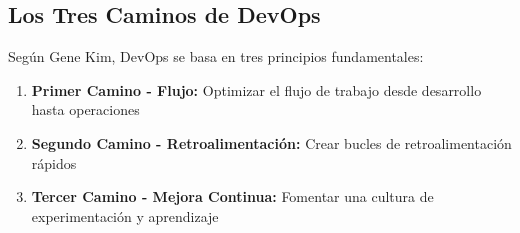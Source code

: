 \documentclass[12pt,a4paper]{article}
\begin{document}
\subsection{Los Tres Caminos de DevOps}
Según Gene Kim, DevOps se basa en tres principios fundamentales:

\begin{enumerate}
    \item \textbf{Primer Camino - Flujo:} Optimizar el flujo de trabajo desde desarrollo hasta operaciones
    \item \textbf{Segundo Camino - Retroalimentación:} Crear bucles de retroalimentación rápidos
    \item \textbf{Tercer Camino - Mejora Continua:} Fomentar una cultura de experimentación y aprendizaje
\end{enumerate}
\end{document}

